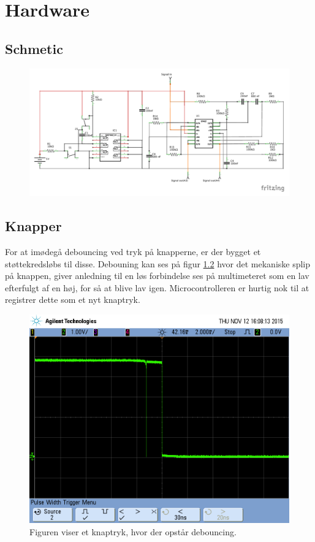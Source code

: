 \newpage
\chapter{Hardware}

\section{Schmetic}
\begin{figure}[H]
	\includegraphics[trim = 0 30 0 0, clip=true, width = \textwidth]{billeder/Konditionering_schem.pdf}
	\caption{}\label{fig:schematics}
\end{figure}

\section{Knapper} \label{title:buttons}
For at imødegå debouncing ved tryk på knapperne, er der bygget et støttekredsløbs til disse. Debouning kan ses på figur \ref{fig:withbounce} hvor det mekaniske splip på knappen, giver anledning til en løs forbindelse ses på multimeteret som en lav efterfulgt af en høj, for så at blive lav igen. Microcontrolleren er hurtig nok til at registrer dette som et nyt knaptryk.
\begin{figure}[H]
	\includegraphics[width = \textwidth]{billeder/scope_14.png}
	\caption{Figuren viser et knaptryk, hvor der opstår debouncing.}\label{fig:withbounce}
\end{figure}

